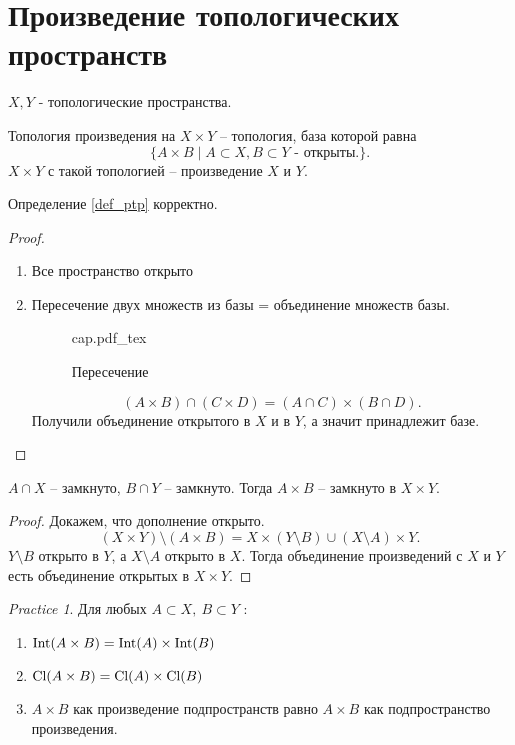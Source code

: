 \documentclass[11pt]{book}
\newcommand{\incfig}[1]{%
    \def\svgwidth{\columnwidth}
    {#1.pdf_tex}
}
\newcommand{\Cl}{{\mathop{\text{\rm Cl}}}}
\newcommand{\Int}{{\mathop{\text{\rm Int}}}}
\theoremstyle{definition}
\theoremstyle{plain}
\theoremstyle{plain}
\theoremstyle{definition}
\theoremstyle{remark}
\newtheorem*{prac}{Practice}
\begin{document}
\section{Произведение топологических пространств}
\begin{defn}\label{def_ptp}
    $X, Y$ - топологические пространства.

    Топология произведения на $X \times Y$ -- топология, база которой равна
    \[
	\{A \times B \mid A \subset X, B \subset Y \mbox{ - открыты.}\}
    .\]
    $X \times Y$ с такой топологией -- произведение $X$ и $Y$.
\end{defn}
\begin{thm}
    Определение \ref{def_ptp} корректно.
\end{thm}
\begin{proof}
    \begin{enumerate}
	\item Все пространство открыто
	\item Пересечение двух множеств из базы = объединение множеств базы.
	    \begin{figure}[ht]
		\centering
		\incfig{cap}
		\caption{Пересечение}
		\label{fig:cap}
	    \end{figure}
	    \[
		(A \times B) \cap (C \times D) = (A \cap C) \times (B \cap D)
	    .\]
	    Получили объединение открытого в $X$ и в $Y$, а значит принадлежит базе.
    \end{enumerate}
\end{proof}
\begin{thm}
    $A \cap X$ -- замкнуто, $B \cap Y$ -- замкнуто. Тогда $A \times B $ -- замкнуто в $X \times Y$.
\end{thm}
\begin{proof}
    Докажем, что дополнение открыто.
    \[
	(X \times Y) \setminus(A \times B) = X \times (Y \setminus B) \cup (X \setminus A) \times Y
    .\]
    $Y \setminus B$ открыто в $Y$, а $X \setminus A$ открыто в $X$. Тогда объединение произведений с $X$ и $Y$ есть объединение открытых в $X \times Y$.
\end{proof}
\begin{prac}
    Для любых $A \subset X, ~ B \subset Y$ :
    \begin{enumerate}
	\item $\Int (A \times B) = \Int(A) \times \Int(B)$
	\item  $\Cl (A \times B) = \Cl(A) \times \Cl(B)$
	\item  $A \times B$  как произведение подпространств равно $A \times B$ как подпространство произведения.
    \end{enumerate}
\end{prac}
\end{document}
